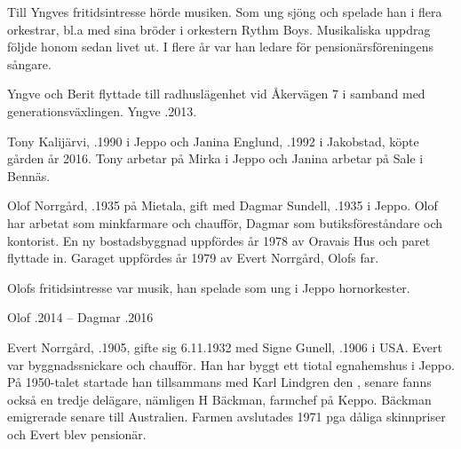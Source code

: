 Till Yngves fritidsintresse hörde musiken. Som ung sjöng och spelade han i flera orkestrar, bl.a med sina bröder i orkestern Rythm Boys. Musikaliska uppdrag följde honom sedan livet ut. I flere år var han ledare för pensionärsföreningens sångare.

Yngve och Berit flyttade till radhuslägenhet vid Åkervägen 7 i samband med generationsväxlingen.
Yngve .2013.






Tony Kalijärvi, .1990 i Jeppo och Janina Englund, .1992 i Jakobstad, köpte gården år 2016. Tony arbetar på Mirka i Jeppo och Janina arbetar på Sale i Bennäs.


Olof Norrgård, .1935 på Mietala, gift med Dagmar Sundell, .1935  i Jeppo. Olof har arbetat som minkfarmare och chaufför, Dagmar som butiksföreståndare och kontorist. En ny bostadsbyggnad uppfördes år 1978 av Oravais Hus och paret flyttade in. Garaget uppfördes år 1979 av Evert Norrgård, Olofs far.

Olofs fritidsintresse var musik, han spelade som ung i Jeppo hornorkester.

Olof .2014  --  Dagmar .2016






Evert Norrgård, .1905, gifte sig 6.11.1932 med Signe Gunell, .1906 i USA. Evert var byggnadssnickare och chaufför. Han har byggt ett tiotal egnahemshus i Jeppo. På 1950-talet startade han tillsammans med Karl Lindgren den , senare fanns också en tredje delägare, nämligen H Bäckman, farmchef på Keppo. Bäckman emigrerade senare till Australien. Farmen avslutades 1971 pga dåliga skinnpriser och Evert blev pensionär.

